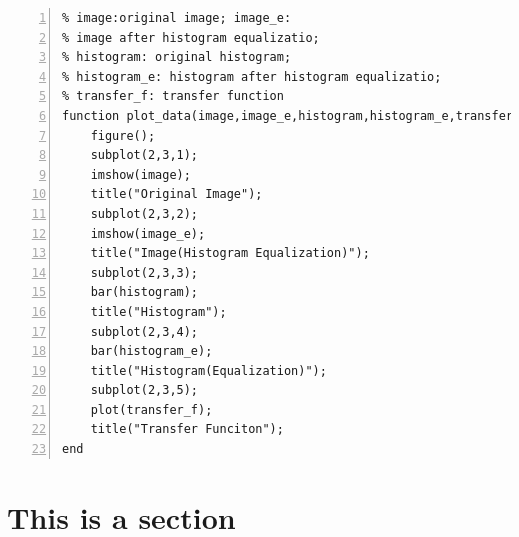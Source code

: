 \documentclass[11pt,oneside]{book}
\begin{document}
\begin{appendices}
\begin{lstlisting}[numbers=left, numberstyle=\tiny,keywordstyle=\color{blue!70},commentstyle=\color{red!50!green!50!blue!50},frame=shadowbox, rulesepcolor=\color{red!20!green!20!blue!20}]
% plot data
% image:original image; image_e: 
% image after histogram equalizatio; 
% histogram: original histogram; 
% histogram_e: histogram after histogram equalizatio;
% transfer_f: transfer function
function plot_data(image,image_e,histogram,histogram_e,transfer_f)
    figure();
    subplot(2,3,1);
    imshow(image);
    title("Original Image");
    subplot(2,3,2);
    imshow(image_e);
    title("Image(Histogram Equalization)");
    subplot(2,3,3);
    bar(histogram);
    title("Histogram");
    subplot(2,3,4);
    bar(histogram_e);
    title("Histogram(Equalization)");
    subplot(2,3,5);
    plot(transfer_f);
    title("Transfer Funciton");
end

\end{lstlisting}


\section{This is a section}


\end{appendices}
\end{document}
